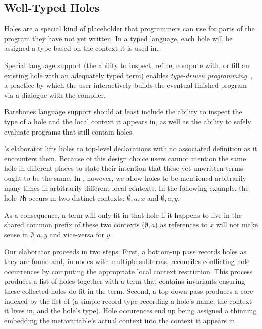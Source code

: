 \subsection{Well-Typed Holes}
\label{sec:design:holes}

Holes are a special kind of placeholder that programmers can use for parts of
the program they have not yet written.
%
In a typed language, each hole will be assigned a type based on the context it
is used in.

Special language support (the ability to inspect, refine, compute with,
or fill an existing hole with an adequately typed term)
enables \emph{type-driven programming}~\cite{DBLP:journals/pacmpl/OmarVCH19},
a practice by which the user interactively builds the eventual finished
program via a dialogue with the compiler.

Barebones language support should at least include the ability to inspect the
type of a hole and the local context it appears in, as well as the ability to
safely evaluate programs that still contain holes.



\Idris{}'s elaborator lifts holes to top-level declarations with no associated
definition as it encounters them.
%
Because of this design choice users cannot mention the same hole in
different places to state their intention that these yet unwritten terms ought
to be the same.
%
In \Velo{}, however, we allow holes to be mentioned arbitrarily many times in
arbitrarily different local contexts. In the following example, the hole
\texttt{?h} occurs in two distinct contexts: $\emptyset,a,x$ and $\emptyset,a,y$.

\begin{center}
  \holeexamplegraph{}
\end{center}

As a consequence, a term will only fit in that hole if it happens to live in the
shared common prefix of these two contexts ($\emptyset,a$) as references to $x$
will not make sense in $\emptyset,a,y$ and vice-versa for $y$.


Our elaborator proceeds in two steps.
%
First, a bottom-up pass records holes as they are found and, in nodes
with multiple subterms, reconciles conflicting hole occurrences by
computing the appropriate local context restriction.
%
This process produces a list of holes together with a 
term that contains invariants ensuring these collected holes do fit in the term.
%
Second, a top-down pass produces a core  indexed by the list
of  (a simple record type recording a hole's name, the context
it lives in, and the hole's type). Hole occurences end up being assigned a thinning
embedding the metavariable's actual context into the context it appears in.


